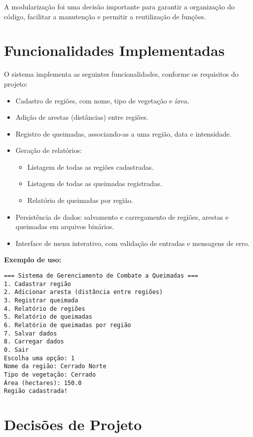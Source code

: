 \documentclass{article}
\begin{document}
A modularização foi uma decisão importante para garantir a organização do código, facilitar a manutenção e permitir a reutilização de funções.

\section{Funcionalidades Implementadas}

O sistema implementa as seguintes funcionalidades, conforme os requisitos do projeto:

\begin{itemize}
    \item Cadastro de regiões, com nome, tipo de vegetação e área.
    \item Adição de arestas (distâncias) entre regiões.
    \item Registro de queimadas, associando-as a uma região, data e intensidade.
    \item Geração de relatórios:
        \begin{itemize}
            \item Listagem de todas as regiões cadastradas.
            \item Listagem de todas as queimadas registradas.
            \item Relatório de queimadas por região.
        \end{itemize}
    \item Persistência de dados: salvamento e carregamento de regiões, arestas e queimadas em arquivos binários.
    \item Interface de menu interativo, com validação de entradas e mensagens de erro.
\end{itemize}

\textbf{Exemplo de uso:}

\begin{verbatim}
=== Sistema de Gerenciamento de Combate a Queimadas ===
1. Cadastrar região
2. Adicionar aresta (distância entre regiões)
3. Registrar queimada
4. Relatório de regiões
5. Relatório de queimadas
6. Relatório de queimadas por região
7. Salvar dados
8. Carregar dados
0. Sair
Escolha uma opção: 1
Nome da região: Cerrado Norte
Tipo de vegetação: Cerrado
Área (hectares): 150.0
Região cadastrada!
\end{verbatim}

\section{Decisões de Projeto}
\end{document}
